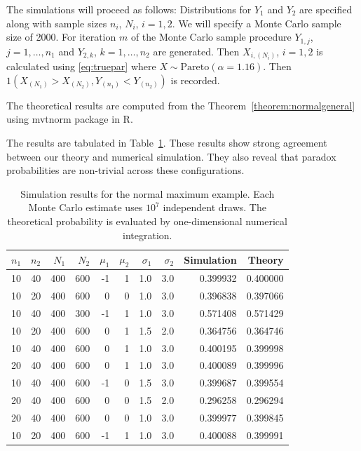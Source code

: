 \documentclass[12pt]{article}
\begin{document}
The simulations will proceed as follows: Distributions for $Y_1$ and $Y_2$ are specified along with sample sizes $n_i$, $N_i$, $i = 1,2$. We will specify a Monte Carlo sample size of 2000. For iteration $m$ of the Monte Carlo sample procedure $Y_{1,j}$, $j=1,\ldots,n_1$ and $Y_{2,k}$, $k=1,\ldots,n_2$ are generated. Then $X_{i,(N_i)}$, $i =1,2$ is calculated using \eqref{eq:truepar} where $X\sim\text{Pareto}(\alpha=1.16)$. Then 
$
  1(X_{(N_1)} > X_{(N_2)}, Y_{(n_1)} < Y_{(n_2)})
$
is recorded. 

The theoretical results are computed from the Theorem~\ref{theorem:normalgeneral} using mvtnorm package \citep{R-mvtnorm} in R.

The results are tabulated in Table~\ref{Tab:simulationnormal}. These results show strong agreement between our theory and numerical simulation. They also reveal that paradox probabilities are non-trivial across these configurations. 

\begin{table}[H]
\centering
\small
\setlength{\tabcolsep}{3pt}
\begin{tabular}{rrrrrrrrrr}
\hline
$n_1$ & $n_2$ & $N_1$ & $N_2$
& $\mu_1$ & $\mu_2$ & $\sigma_1$ & $\sigma_2$
& Simulation & Theory \\
\hline
10 & 40 & 400 & 600 & -1 & 1 & 1.0 & 3.0 & 0.399932 & 0.400000 \\
10 & 20 & 400 & 600 &  0 & 0 & 1.0 & 3.0 & 0.396838 & 0.397066 \\
10 & 40 & 400 & 300 & -1 & 1 & 1.0 & 3.0 & 0.571408 & 0.571429 \\
10 & 20 & 400 & 600 &  0 & 1 & 1.5 & 2.0 & 0.364756 & 0.364746 \\
10 & 40 & 400 & 600 &  0 & 1 & 1.0 & 3.0 & 0.400195 & 0.399998 \\
20 & 40 & 400 & 600 &  0 & 1 & 1.0 & 3.0 & 0.400089 & 0.399996 \\
10 & 40 & 400 & 600 & -1 & 0 & 1.5 & 3.0 & 0.399687 & 0.399554 \\
20 & 40 & 400 & 600 &  0 & 0 & 1.5 & 2.0 & 0.296258 & 0.296294 \\
20 & 40 & 400 & 600 &  0 & 0 & 1.0 & 3.0 & 0.399977 & 0.399845 \\
10 & 20 & 400 & 600 & -1 & 1 & 1.0 & 3.0 & 0.400088 & 0.399991 \\
\hline
\end{tabular}
\caption{Simulation results for the normal maximum example. Each Monte
Carlo estimate uses $10^7$ independent draws. The theoretical probability
is evaluated by one-dimensional numerical integration.}
\label{Tab:simulationnormal}
\end{table}
\end{document}
